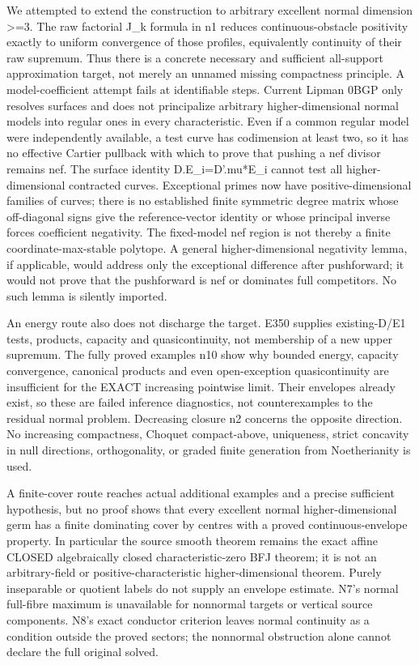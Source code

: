 \documentclass[11pt]{article}
\begin{document}
We attempted to extend the construction to arbitrary excellent normal dimension >=3. The raw factorial J\_k formula in n1 reduces continuous-obstacle positivity exactly to uniform convergence of those profiles, equivalently continuity of their raw supremum. Thus there is a concrete necessary and sufficient all-support approximation target, not merely an unnamed missing compactness principle. A model-coefficient attempt fails at identifiable steps. Current Lipman 0BGP only resolves surfaces and does not principalize arbitrary higher-dimensional normal models into regular ones in every characteristic. Even if a common regular model were independently available, a test curve has codimension at least two, so it has no effective Cartier pullback with which to prove that pushing a nef divisor remains nef. The surface identity D.E\_i=D'.mu*E\_i cannot test all higher-dimensional contracted curves. Exceptional primes now have positive-dimensional families of curves; there is no established finite symmetric degree matrix whose off-diagonal signs give the reference-vector identity or whose principal inverse forces coefficient negativity. The fixed-model nef region is not thereby a finite coordinate-max-stable polytope. A general higher-dimensional negativity lemma, if applicable, would address only the exceptional difference after pushforward; it would not prove that the pushforward is nef or dominates full competitors. No such lemma is silently imported.

An energy route also does not discharge the target. E350 supplies existing-D/E1 tests, products, capacity and quasicontinuity, not membership of a new upper supremum. The fully proved examples n10 show why bounded energy, capacity convergence, canonical products and even open-exception quasicontinuity are insufficient for the EXACT increasing pointwise limit. Their envelopes already exist, so these are failed inference diagnostics, not counterexamples to the residual normal problem. Decreasing closure n2 concerns the opposite direction. No increasing compactness, Choquet compact-above, uniqueness, strict concavity in null directions, orthogonality, or graded finite generation from Noetherianity is used.

A finite-cover route reaches actual additional examples and a precise sufficient hypothesis, but no proof shows that every excellent normal higher-dimensional germ has a finite dominating cover by centres with a proved continuous-envelope property. In particular the source smooth theorem remains the exact affine CLOSED algebraically closed characteristic-zero BFJ theorem; it is not an arbitrary-field or positive-characteristic higher-dimensional theorem. Purely inseparable or quotient labels do not supply an envelope estimate. N7's normal full-fibre maximum is unavailable for nonnormal targets or vertical source components. N8's exact conductor criterion leaves normal continuity as a condition outside the proved sectors; the nonnormal obstruction alone cannot declare the full original solved.
\end{document}
